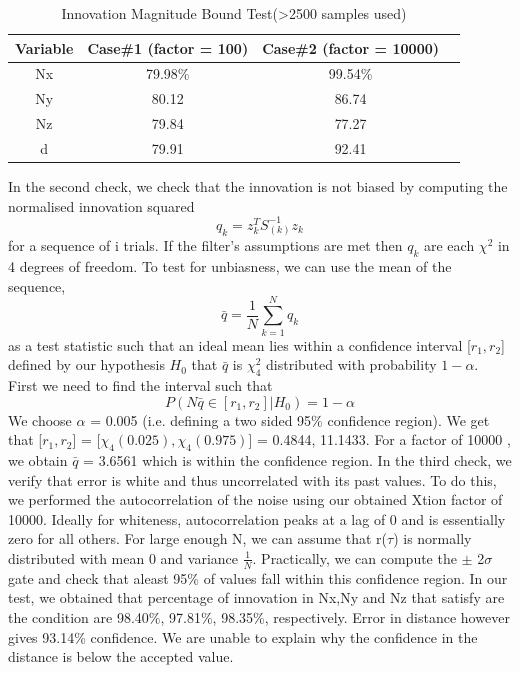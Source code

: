 \documentclass[]{article}
\begin{document}
{\begin{table}[ht]
\caption{Innovation Magnitude Bound Test(\textgreater 2500 samples used)} %
\centering %
\begin{tabular}{c c c c} %
\hline\hline %
Variable & Case\#1 (factor = 100) & Case\#2 (factor = 10000)  \\ [0.5ex] %
\hline %
    Nx 	& 79.98\% 	& 99.54\%\\
    Ny 	& 80.12 	& 86.74 \\
    Nz 	& 79.84 	& 77.27 \\
    d 	& 79.91 	&	92.41 \\ [1ex] %
\hline %
\end{tabular}
\label{table:firstTest} %
\end{table}
In the second check, we check that the innovation is not biased by computing the normalised innovation squared
\begin{equation}
	q_{k} = z_{k}^{T} S_(k)^{-1} z_{k}
\end{equation}
for a sequence of i trials. If the filter's assumptions are met then $q_{k}$ are each $\chi^{2}$ in 4 degrees of freedom. To test for unbiasness, we can use the mean of the sequence,
\begin{equation}
	\bar{q} = \frac{1}{N}\sum_{k=1}^N {q_k}
\end{equation}
as a test statistic such that an ideal mean lies within a confidence interval [$r_{1}, r_{2}$] defined by our hypothesis $H_0$ that $\bar{q}$ is  $\chi_{4}^{2}$ distributed with probability $1-\alpha$. First we need to find the interval such that
\begin{equation}
P(N\bar{q}\in [r_{1}, r_{2}] | H_{0}) = 1 - \alpha 
\end{equation}
We choose $\alpha$ = 0.005 (i.e. defining a two sided 95\% confidence region). We get that
[$r_{1}, r_{2}$] = [$\chi_{4}(0.025), \chi_{4}(0.975)$] = 0.4844, 11.1433. For a factor of 10000 , we obtain $\bar{q}$ = 3.6561 which is within the confidence region.
In the third check, we verify that error is white and thus uncorrelated with its past values. To do this, we performed the autocorrelation of the noise using our obtained Xtion factor of 10000. Ideally for whiteness, autocorrelation peaks at a lag of 0 and is essentially zero for all others. For large enough N, we can assume that r($\tau$) is normally distributed with mean 0 and variance $\frac{1}{N}$. Practically, we can compute the $\pm$ 2$\sigma$ gate and check that aleast 95\% of values fall within this confidence region. In our test, we obtained that percentage of innovation in Nx,Ny and Nz that satisfy are the condition are 98.40$\%$, 97.81\%, 98.35\%, respectively. Error in distance however gives 93.14\% confidence. We are unable to explain why the confidence in the distance is below the accepted value.
}
\end{document}
